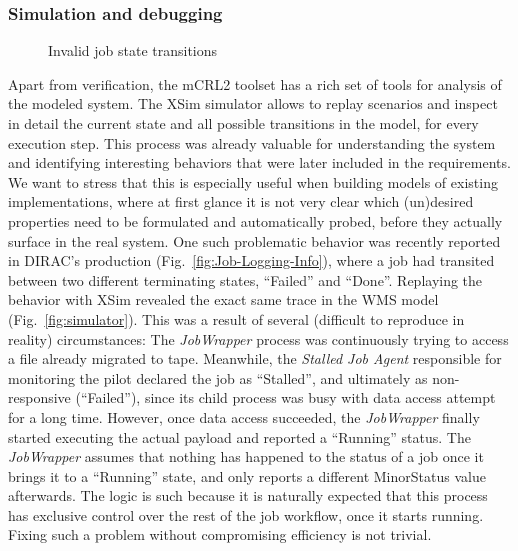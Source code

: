 \documentclass[10pt,conference]{IEEEtran}
\begin{document}
\subsubsection{Simulation and debugging}
\begin{figure}[tp!]
  \centering
  \hfill
  \caption{Invalid job state transitions}
  \label{fig:Simulator-job-trace}
\vspace{-8 pt}
\end{figure}

Apart from verification, the mCRL2 toolset has a rich set of tools for analysis of the modeled system. 
The XSim simulator allows to replay scenarios and inspect in 
detail the current state and all possible transitions in the model, for every execution step. 
This process was already valuable for understanding the
system and identifying interesting behaviors that were later included
in the requirements. We want to stress that this is especially useful
when building models of existing implementations, where at first glance it 
is not very clear which (un)desired properties need to be formulated and automatically probed,
before they actually surface in the real system.
One such problematic behavior was recently reported in DIRAC's production (Fig.~\ref{fig:Job-Logging-Info}), where
a job had transited between two different terminating states, ``Failed'' and ``Done''.
Replaying the behavior with XSim revealed the exact same trace in the WMS model (Fig.~\ref{fig:simulator}).
This was a result of several (difficult to reproduce in reality) circumstances:
The \textit{JobWrapper} process was continuously trying to access a file already 
migrated to tape. Meanwhile, the \textit{Stalled Job Agent} responsible for 
monitoring the pilot declared the job as ``Stalled'', and ultimately as non-responsive (``Failed''),
since its child process was busy with data access attempt for a long time.
However, once data access succeeded, the \textit{JobWrapper} finally started executing the 
actual payload and reported a ``Running'' status. 
The \textit{JobWrapper} assumes that nothing has happened to the status of a job once 
it brings it to a ``Running'' state, 
and only reports a different MinorStatus value afterwards.
The logic is such
because it is naturally expected that this process has exclusive control 
over the rest of the job workflow, once it starts running. Fixing such
a problem without compromising efficiency is not trivial.
\end{document}

